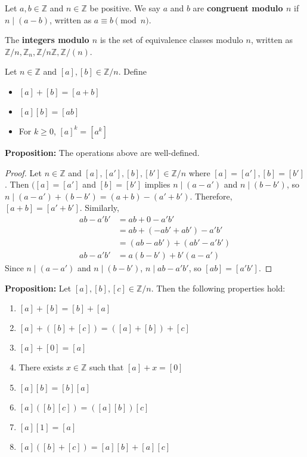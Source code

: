 \documentclass [12pt] {article}
\newcommand{\Z}{\mathbb{Z}}
\newenvironment{definition}[1]{\begin{tcolorbox}[title={Definition: #1},colback=blue!5!white,colframe=black!75!blue]}{\end{tcolorbox}}
\renewcommand{\bf}[1]{\textbf{{#1}}}
\begin{document}
\begin{definition}{Congruent Modulo $n$}
    Let $a, b \in \Z$ and $n \in \Z$ be positive. We say $a$ and $b$ are \bf{congruent modulo $n$}
    if $n \mid (a - b)$, written as $a \equiv b \pmod{n}$.
    \vspace{1em}

    The \bf{integers modulo $n$} is the set of equivalence classes modulo $n$, written as
    $\Z/n, \Z_n, \Z/n\Z, \Z/(n)$.
\end{definition}

\begin{definition}{Operations on $\Z/n$}
    Let $n \in \Z$ and $[a], [b] \in \Z/n$. Define
    \begin{itemize}[label=$\to$]
        \item $[a] + [b] = [a + b]$
        \item $[a][b] = [ab]$
        \item For $k \geq 0$, $[a]^k = [a^k]$
    \end{itemize}
\end{definition}
\bf{Proposition:} The operations above are well-defined.
\begin{proof}
    Let $n \in \Z$ and $[a], [a'], [b], [b'] \in \Z/n$ where $[a] = [a'], [b] = [b']$. Then
    $([a] = [a']$ and $[b] = [b']$ implies $n \mid (a - a')$ and $n \mid (b - b')$, so 
    $n \mid (a - a') + (b - b') = (a + b) - (a' + b')$. Therefore, $[a + b] = [a' + b']$. Similarly,
    \begin{align*}
        ab - a'b' &= ab + 0 - a'b' \\
                  &= ab + (-ab' + ab') - a'b' \\ 
                  &= (ab - ab') + (ab' - a'b') \\
        ab - a'b' &= a(b - b') + b'(a - a')
    \end{align*}
    Since $n \mid (a - a')$ and $n \mid (b - b')$, $n \mid ab - a'b'$, so $[ab] = [a'b']$.
\end{proof}
\bf{Proposition:} Let $[a], [b], [c] \in \Z/n$. Then the following properties hold:
\begin{enumerate}[label=(\arabic*)]
    \item $[a] + [b] = [b] + [a]$
    \item $[a] + ([b] + [c]) = ([a] + [b]) + [c]$
    \item $[a] + [0] = [a]$
    \item There exists $x \in \Z$ such that $[a] + x = [0]$
    \item $[a][b] = [b][a]$
    \item $[a] ([b][c]) = ([a][b]) [c]$
    \item $[a][1] = [a]$
    \item $[a] ([b] + [c]) = [a][b] + [a][c]$
\end{enumerate}
\end{document}

